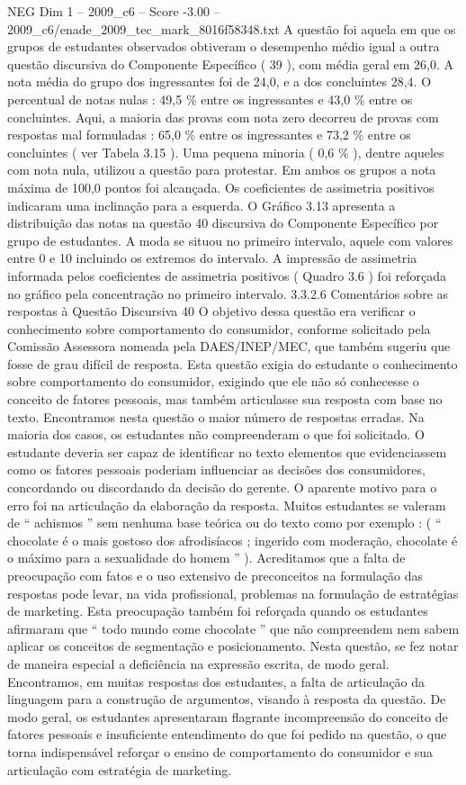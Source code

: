 \begin{textsample}{NEG Dim 1 – 2009\_c6 – Score -3.00 – 2009\_c6/enade\_2009\_tec\_mark\_8016f58348.txt}
A questão foi aquela em que os grupos de estudantes observados obtiveram o desempenho médio igual a outra questão discursiva do Componente Específico ( 39 ), com média geral em 26,0.
A nota média do grupo dos ingressantes foi de 24,0, e a dos concluintes 28,4.
O percentual de notas nulas : 49,5 \% entre os ingressantes e 43,0 \% entre os concluintes.
Aqui, a maioria das provas com nota zero decorreu de provas com respostas mal formuladas : 65,0 \% entre os ingressantes e 73,2 \% entre os concluintes ( ver Tabela 3.15 ).
Uma pequena minoria ( 0,6 \% ), dentre aqueles com nota nula, utilizou a questão para protestar.
Em ambos os grupos a nota máxima de 100,0 pontos foi alcançada.
Os coeficientes de assimetria positivos indicaram uma inclinação para a esquerda.
O Gráfico 3.13 apresenta a distribuição das notas na questão 40 discursiva do Componente Específico por grupo de estudantes.
A moda se situou no primeiro intervalo, aquele com valores entre 0 e 10 incluindo os extremos do intervalo.
A impressão de assimetria informada pelos coeficientes de assimetria positivos ( Quadro 3.6 ) foi reforçada no gráfico pela concentração no primeiro intervalo. 3.3.2.6 Comentários sobre as respostas à Questão Discursiva 40 O objetivo dessa questão era verificar o conhecimento sobre comportamento do consumidor, conforme solicitado pela Comissão Assessora nomeada pela DAES/INEP/MEC, que também sugeriu que fosse de grau difícil de resposta.
Esta questão exigia do estudante o conhecimento sobre comportamento do consumidor, exigindo que ele não só conhecesse o conceito de fatores pessoais, mas também articulasse sua resposta com base no texto.
Encontramos nesta questão o maior número de respostas erradas.
Na maioria dos casos, os estudantes não compreenderam o que foi solicitado.
O estudante deveria ser capaz de identificar no texto elementos que evidenciassem como os fatores pessoais poderiam influenciar as decisões dos consumidores, concordando ou discordando da decisão do gerente.
O aparente motivo para o erro foi na articulação da elaboração da resposta.
Muitos estudantes se valeram de “ achismos ” sem nenhuma base teórica ou do texto como por exemplo : ( “ chocolate é o mais gostoso dos afrodisíacos ; ingerido com moderação, chocolate é o máximo para a sexualidade do homem ” ).
Acreditamos que a falta de preocupação com fatos e o uso extensivo de preconceitos na formulação das respostas pode levar, na vida profissional, problemas na formulação de estratégias de marketing.
Esta preocupação também foi reforçada quando os estudantes afirmaram que “ todo mundo come chocolate ” que não compreendem nem sabem aplicar os conceitos de segmentação e posicionamento.
Nesta questão, se fez notar de maneira especial a deficiência na expressão escrita, de modo geral.
Encontramos, em muitas respostas dos estudantes, a falta de articulação da linguagem para a construção de argumentos, visando à resposta da questão.
De modo geral, os estudantes apresentaram flagrante incompreensão do conceito de fatores pessoais e insuficiente entendimento do que foi pedido na questão, o que torna indispensável reforçar o ensino de comportamento do consumidor e sua articulação com estratégia de marketing.


\end{textsample}
